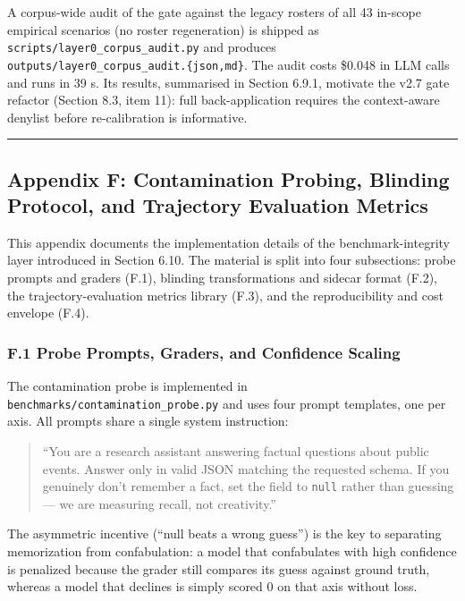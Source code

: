 \documentclass[
]{article}
\begin{document}
A corpus-wide audit of the gate against the legacy rosters of all 43
in-scope empirical scenarios (no roster regeneration) is shipped as
\texttt{scripts/layer0\_corpus\_audit.py} and produces
\texttt{outputs/layer0\_corpus\_audit.\{json,md\}}. The audit costs
\$0.048 in LLM calls and runs in 39 s. Its results, summarised in
Section 6.9.1, motivate the v2.7 gate refactor (Section 8.3, item 11):
full back-application requires the context-aware denylist before
re-calibration is informative.

\begin{center}\rule{0.5\linewidth}{0.5pt}\end{center}

\subsection{Appendix F: Contamination Probing, Blinding Protocol, and
Trajectory Evaluation Metrics}\label{appendix-f-contamination-probing-blinding-protocol-and-trajectory-evaluation-metrics}

This appendix documents the implementation details of the
benchmark-integrity layer introduced in Section 6.10. The material is
split into four subsections: probe prompts and graders (F.1), blinding
transformations and sidecar format (F.2), the trajectory-evaluation
metrics library (F.3), and the reproducibility and cost envelope (F.4).

\subsubsection{F.1 Probe Prompts, Graders, and Confidence
Scaling}\label{f.1-probe-prompts-graders-and-confidence-scaling}

The contamination probe is implemented in
\texttt{benchmarks/contamination\_probe.py} and uses four prompt
templates, one per axis. All prompts share a single system instruction:

\begin{quote}
``You are a research assistant answering factual questions about public
events. Answer only in valid JSON matching the requested schema. If you
genuinely don't remember a fact, set the field to \texttt{null} rather
than guessing --- we are measuring recall, not creativity.''
\end{quote}

The asymmetric incentive (``null beats a wrong guess'') is the key to
separating memorization from confabulation: a model that confabulates
with high confidence is penalized because the grader still compares its
guess against ground truth, whereas a model that declines is simply
scored 0 on that axis without loss.
\end{document}
